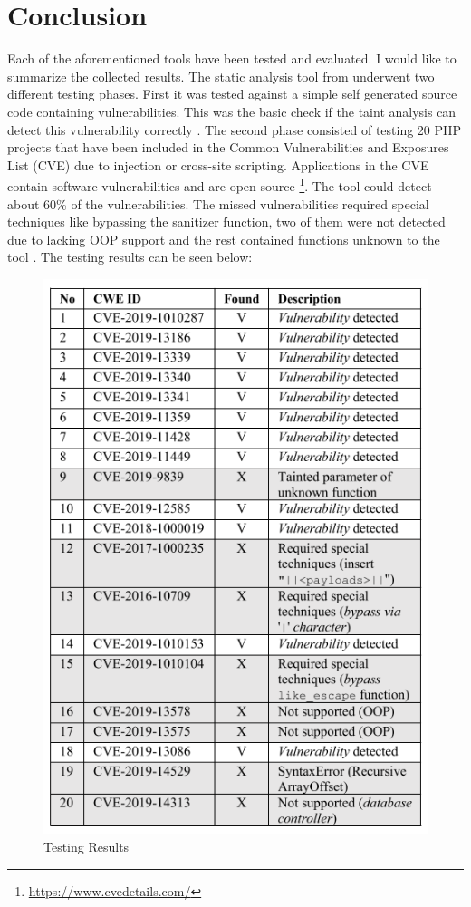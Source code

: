 \section{Conclusion}  
Each of the aforementioned tools have been tested and evaluated. I would like to summarize the collected results. The static analysis tool from \textcite[]{Maskur2019} underwent two different testing phases. First it was tested against a simple self generated source code containing vulnerabilities. This was the basic check if the taint analysis can detect this vulnerability correctly \autocite[4f]{Maskur2019}. The second phase consisted of testing 20 PHP projects that have been included in the Common Vulnerabilities and Exposures List (CVE) due to injection or cross-site scripting. Applications in the CVE contain software vulnerabilities and are open source \footnote{ \url{https://www.cvedetails.com/}}. The tool could detect about 60\% of the vulnerabilities. The missed vulnerabilities required special techniques like bypassing the sanitizer function, two of them were not detected due to lacking OOP support and the rest contained functions unknown to the tool \autocite[5]{Maskur2019}. The testing results can be seen below: 

\begin{figure}[H]
\centering
\includegraphics[scale=0.75]{static_experiment_table.PNG}
\caption{Testing Results \autocite[5]{Maskur2019}}
\end{figure}

